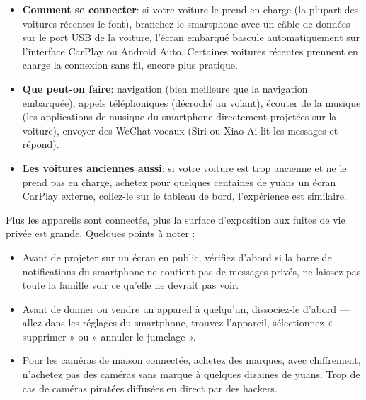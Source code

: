 \begin{itemize}
  \item \textbf{Comment se connecter}: si votre voiture le prend en charge (la plupart des voitures récentes le font), branchez le smartphone avec un câble de données sur le port USB de la voiture, l'écran embarqué bascule automatiquement sur l'interface CarPlay ou Android Auto. Certaines voitures récentes prennent en charge la connexion sans fil, encore plus pratique.
  \item \textbf{Que peut-on faire}: navigation (bien meilleure que la navigation embarquée), appels téléphoniques (décroché au volant), écouter de la musique (les applications de musique du smartphone directement projetées sur la voiture), envoyer des WeChat vocaux (Siri ou Xiao Ai lit les messages et répond).
  \item \textbf{Les voitures anciennes aussi}: si votre voiture est trop ancienne et ne le prend pas en charge, achetez pour quelques centaines de yuans un écran CarPlay externe, collez-le sur le tableau de bord, l'expérience est similaire.
\end{itemize}


Plus les appareils sont connectés, plus la surface d'exposition aux fuites de vie privée est grande. Quelques points à noter :

\begin{itemize}
  \item Avant de projeter sur un écran en public, vérifiez d'abord si la barre de notifications du smartphone ne contient pas de messages privés, ne laissez pas toute la famille voir ce qu'elle ne devrait pas voir.
  \item Avant de donner ou vendre un appareil à quelqu'un, dissociez-le d'abord — allez dans les réglages du smartphone, trouvez l'appareil, sélectionnez « supprimer » ou « annuler le jumelage ».
  \item Pour les caméras de maison connectée, achetez des marques, avec chiffrement, n'achetez pas des caméras sans marque à quelques dizaines de yuans. Trop de cas de caméras piratées diffusées en direct par des hackers.
\end{itemize}

